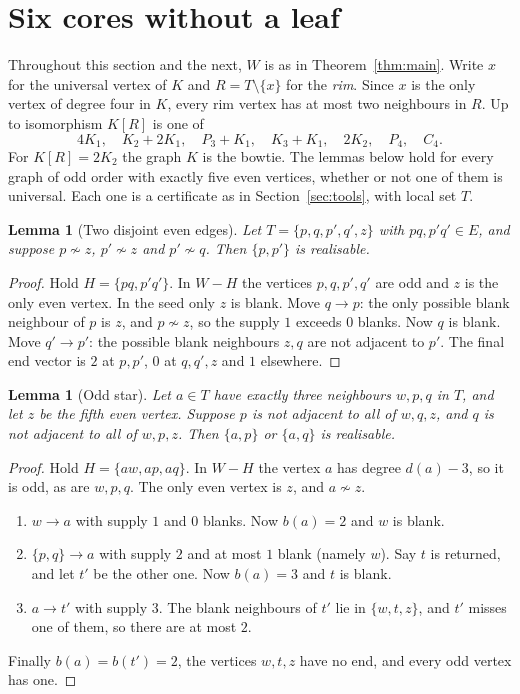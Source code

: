 \documentclass[11pt]{amsart}
\newtheorem{lemma}[theorem]{Lemma}
\theoremstyle{definition}
\newcommand{\tr}{\to}
\begin{document}
\section{Six cores without a leaf}\label{sec:local}

Throughout this section and the next, $W$ is as in Theorem~\ref{thm:main}. Write $x$ for the
universal vertex of $K$ and $R=T\setminus\{x\}$ for the \emph{rim}. Since $x$ is the only vertex of
degree four in $K$, every rim vertex has at most two neighbours in $R$. Up to isomorphism $K[R]$ is
one of
\[
4K_1,\quad K_2+2K_1,\quad P_3+K_1,\quad K_3+K_1,\quad 2K_2,\quad P_4,\quad C_4 .
\]
For $K[R]=2K_2$ the graph $K$ is the bowtie. The lemmas below hold for every graph of odd order with
exactly five even vertices, whether or not one of them is universal. Each one is a certificate as in
Section~\ref{sec:tools}, with local set $T$.

\begin{lemma}[Two disjoint even edges]\label{lem:match}
Let $T=\{p,q,p',q',z\}$ with $pq,p'q'\in E$, and suppose $p\not\sim z$, $p'\not\sim z$ and
$p'\not\sim q$. Then $\{p,p'\}$ is realisable.
\end{lemma}

\begin{proof}
Hold $H=\{pq,p'q'\}$. In $W-H$ the vertices $p,q,p',q'$ are odd and $z$ is the only even vertex.
In the seed only $z$ is blank. Move $q\tr p$: the only possible blank neighbour of $p$ is $z$, and
$p\not\sim z$, so the supply $1$ exceeds $0$ blanks. Now $q$ is blank. Move $q'\tr p'$: the possible
blank neighbours $z,q$ are not adjacent to $p'$. The final end vector is $2$ at $p,p'$, $0$ at
$q,q',z$ and $1$ elsewhere.
\end{proof}

\begin{lemma}[Odd star]\label{lem:oddstar}
Let $a\in T$ have exactly three neighbours $w,p,q$ in $T$, and let $z$ be the fifth even vertex.
Suppose $p$ is not adjacent to all of $w,q,z$, and $q$ is not adjacent to all of $w,p,z$. Then $\{a,p\}$
or $\{a,q\}$ is realisable.
\end{lemma}

\begin{proof}
Hold $H=\{aw,ap,aq\}$. In $W-H$ the vertex $a$ has degree $d(a)-3$, so it is odd, as are $w,p,q$.
The only even vertex is $z$, and $a\not\sim z$.
\begin{enumerate}
\item $w\tr a$ with supply $1$ and $0$ blanks. Now $b(a)=2$ and $w$ is blank.
\item $\{p,q\}\tr a$ with supply $2$ and at most $1$ blank (namely $w$). Say $t$ is returned, and
let $t'$ be the other one. Now $b(a)=3$ and $t$ is blank.
\item $a\tr t'$ with supply $3$. The blank neighbours of $t'$ lie in $\{w,t,z\}$, and $t'$ misses
one of them, so there are at most $2$.
\end{enumerate}
Finally $b(a)=b(t')=2$, the vertices $w,t,z$ have no end, and every odd vertex has one.
\end{proof}
\end{document}
